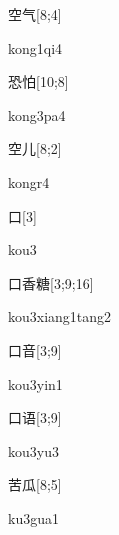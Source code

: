\begin{verbete}[kong1qi4]{空气}[8;4]
\begin{pronuncia}{kong1qi4}
\end{pronuncia}
\end{verbete}

\begin{verbete}[kong3pa4]{恐怕}[10;8]
\begin{pronuncia}{kong3pa4}
\end{pronuncia}
\end{verbete}

\begin{verbete}[kongr4]{空儿}[8;2]
\begin{pronuncia}{kongr4}
\end{pronuncia}
\end{verbete}

\begin{verbete}[kou3]{口}[3]
\begin{pronuncia}{kou3}
\end{pronuncia}
\end{verbete}

\begin{verbete}{口香糖}[3;9;16]
\begin{pronuncia}[\\]{kou3xiang1tang2}
\end{pronuncia}
\end{verbete}

\begin{verbete}{口音}[3;9]
\begin{pronuncia}{kou3yin1}
\end{pronuncia}
\end{verbete}

\begin{verbete}[kou3yu3]{口语}[3;9]
\begin{pronuncia}{kou3yu3}
\end{pronuncia}
\end{verbete}

\begin{verbete}[ku3gua1]{苦瓜}[8;5]
\begin{pronuncia}{ku3gua1}
\end{pronuncia}
\end{verbete}

